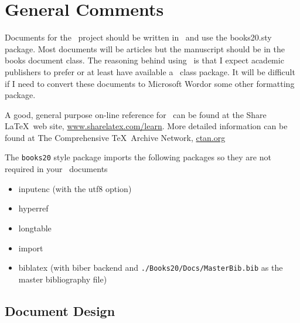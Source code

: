 \section{General Comments}

Documents for the \ProjectTitle\ project should be written in \LaTeXe\ and use
the books20.sty package. Most documents will be articles but the
manuscript should be in the books document class. The reasoning behind
using \LaTeXe\ is that I expect academic publishers to prefer or at
least have available a \LaTeXe\ class package.  It will be difficult if
I need to convert these documents to Microsoft Word\texttrademark or
some other formatting package.

A good, general purpose on-line reference for \LaTeXe\ can be found at
the Share \LaTeX\ web site,
\href{http://www.sharelatex.com/learn}{www.sharelatex.com/learn}.
More detailed information can be found at The Comprehensive
\TeX\ Archive Network, \href{ctan.org}{ctan.org}

The \texttt{books20} style package imports the following packages so they are
not required in your \LaTeXe\ documents

\begin{itemize}
\item inputenc \cite{Jeffrey2018} (with the utf8 option)
\item hyperref \cite{Rahtz2017}
\item longtable \cite{Carlisle2014}
\item import \cite{Arseneau2009}
\item biblatex \cite{Lehman2018} (with biber backend and
  \texttt{./Books20/Docs/MasterBib.bib} as the master bibliography file)
\end{itemize}


\subsection{Document Design}

